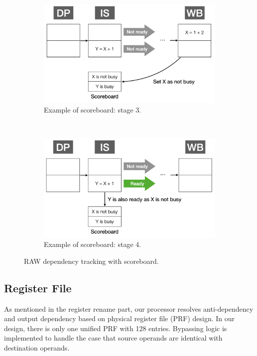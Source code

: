 \begin{figure}[!htp]
    \begin{subfigure}{0.4\textwidth}
        \includegraphics[width=\textwidth]{figure/sb3.png}
        \caption{Example of scoreboard: stage 3.}
        \label{fig:sb-3}
    \end{subfigure}
    ~
    \begin{subfigure}{0.4\textwidth}
        \includegraphics[width=\textwidth]{figure/sb4.png}
        \caption{Example of scoreboard: stage 4.}
        \label{fig:sb-4}
    \end{subfigure}
    \caption{RAW dependency tracking with scoreboard.}
    \label{fig:sb}
\end{figure}

\subsection{Register File} %

As mentioned in the register rename part, our processor resolves anti-dependency and output dependency based on physical register file (PRF) design. In our design, there is only one unified PRF with 128 entries. Bypassing logic is implemented to handle the case that source operands are identical with destination operands. 

